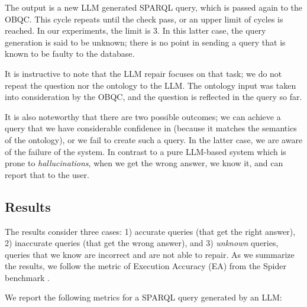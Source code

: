 \documentclass[11pt]{article}
\begin{document}







The output is a new LLM generated SPARQL query, which is passed again to the OBQC.
This cycle repeats until the check pass, or an upper limit of cycles is reached. 
In our experiments, the limit is 3. 
In this latter case, the query generation is said to be unknown; there is no point in sending a query that is known to be faulty to the database. 

It is instructive to note that the LLM repair focuses on that task; we do not repeat the question nor the ontology to the LLM. 
The ontology input was taken into consideration by the OBQC, and the question is reflected in the query so far. 

It is also noteworthy that there are two possible outcomes; we can achieve a query that we have considerable confidence in (because it matches the semantics of the ontology), or we fail to create such a query. 
In the latter case, we are aware of the failure of the system. 
In contrast to a pure LLM-based system which is prone to \textit{hallucinations}, when we get the wrong answer, we know it, and can report that to the user. 


\subsection{Results}
The results consider three cases: 1) accurate queries (that get the right answer), 2) inaccurate queries (that get the wrong answer), and 3) {\it unknown} queries, queries that we know are incorrect and are not able to repair. 
As we summarize the results, we follow the metric of Execution Accuracy (EA) from the Spider benchmark \cite{data-spider}.

We report the following metrics for a SPARQL query generated by an LLM: 
\end{document}
